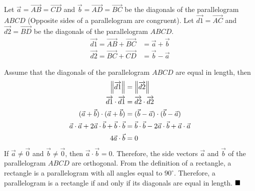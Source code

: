 \begin{enumerate}
          Let $\vec{a} = \overrightarrow{AB} = \overrightarrow{CD}$ and $\vec{b} = \overrightarrow{AD} = \overrightarrow{BC}$ be the diagonals of the parallelogram $ABCD$ (Opposite sides of a parallelogram are congruent). Let $\overrightarrow{d1} = \overrightarrow{AC}$ and $\overrightarrow{d2} = \overrightarrow{BD}$ be the diagonals of the parallelogram $ABCD$.
          \begin{align*}
              \overrightarrow{d1} = \overrightarrow{AB} + \overrightarrow{BC} & = \vec{a} + \vec{b} \\
              \overrightarrow{d2} = \overrightarrow{BC} + \overrightarrow{CD} & = \vec{b} - \vec{a}
          \end{align*}

          Assume that the diagonals of the parallelogram $ABCD$ are equal in length, then
          \begin{align*}
              \left\lVert\overrightarrow{d1}\right\rVert                                             & = \left\lVert\overrightarrow{d2}\right\rVert                                             \\
              \overrightarrow{d1} \cdot \overrightarrow{d1}                          & = \overrightarrow{d2} \cdot \overrightarrow{d2}                          \\
              (\vec{a} + \vec{b}) \cdot (\vec{a} + \vec{b})                          & = (\vec{b} - \vec{a}) \cdot (\vec{b} - \vec{a})                          \\
              \vec{a} \cdot \vec{a} + 2\vec{a} \cdot \vec{b} + \vec{b} \cdot \vec{b} & = \vec{b} \cdot \vec{b} - 2\vec{a} \cdot \vec{b} + \vec{a} \cdot \vec{a} \\
              4\vec{a} \cdot \vec{b}                                                 & = 0
          \end{align*}
          If $\vec{a} \neq \vec{0}$ and $\vec{b} \neq \vec{0}$, then $\vec{a} \cdot \vec{b} = 0$. Therefore, the side vectors $\vec{a}$ and $\vec{b}$ of the parallelogram $ABCD$ are orthogonal. From the definition of a rectangle, a rectangle is a parallelogram with all angles equal to $90^{\circ}$. Therefore, a parallelogram is a rectangle if and only if its diagonals are equal in length. $\hfill\blacksquare$
\end{enumerate}